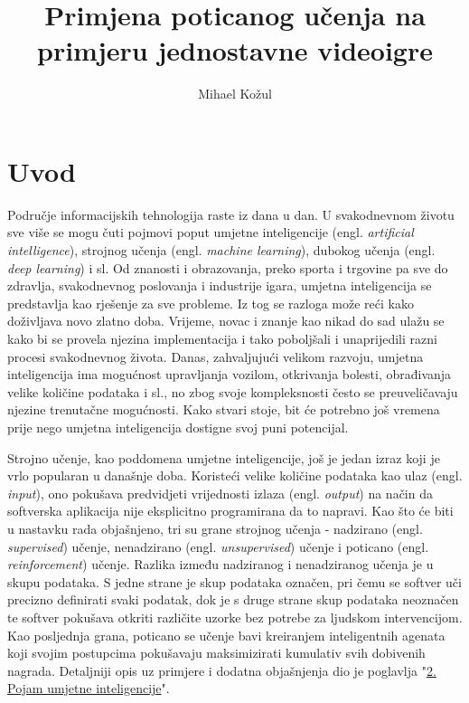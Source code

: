\documentclass[]{foi} %
\title{Primjena poticanog učenja na primjeru jednostavne videoigre}
\author{Mihael Kožul} %
\begin{document}
\maketitle

\tableofcontents

\makeatletter {} \makeatother
\pagestyle{plain}

\chapter{Uvod}
Područje informacijskih tehnologija raste iz dana u dan. U svakodnevnom životu sve više se mogu čuti pojmovi poput umjetne inteligencije (engl. \textit{artificial intelligence}), strojnog učenja (engl. \textit{machine learning}), dubokog učenja (engl. \textit{deep learning}) i sl. Od znanosti i obrazovanja, preko sporta i  trgovine pa sve do zdravlja, svakodnevnog poslovanja i industrije igara, umjetna inteligencija se predstavlja kao rješenje za sve probleme. Iz tog se razloga može reći kako doživljava novo zlatno doba. Vrijeme, novac i znanje kao nikad do sad ulažu se kako bi se provela njezina implementacija i tako poboljšali i unaprijedili razni procesi svakodnevnog života. Danas, zahvaljujući velikom razvoju, umjetna inteligencija ima mogućnost upravljanja vozilom, otkrivanja bolesti, obrađivanja velike količine podataka i sl., no zbog svoje kompleksnosti često se preuveličavaju njezine trenutačne mogućnosti. Kako stvari stoje, bit će potrebno još vremena prije nego umjetna inteligencija dostigne svoj puni potencijal.

Strojno učenje, kao poddomena umjetne inteligencije, još je jedan izraz koji je vrlo popularan u današnje doba. Koristeći velike količine podataka kao ulaz (engl. \textit{input}), ono pokušava predvidjeti vrijednosti izlaza (engl. \textit{output}) na način da softverska aplikacija nije eksplicitno programirana da to napravi. Kao što će biti u nastavku rada objašnjeno, tri su grane strojnog učenja - nadzirano (engl. \textit{supervised}) učenje, nenadzirano (engl. \textit{unsupervised}) učenje i poticano (engl. \textit{reinforcement}) učenje. Razlika između nadziranog i nenadziranog učenja je u skupu podataka. S jedne strane je skup podataka označen, pri čemu se softver uči precizno definirati svaki podatak, dok je s druge strane skup podataka neoznačen te softver pokušava otkriti različite uzorke bez potrebe za ljudskom intervencijom. Kao posljednja grana, poticano se učenje bavi kreiranjem inteligentnih agenata koji svojim postupcima pokušavaju maksimizirati kumulativ svih dobivenih nagrada. Detaljniji opis uz primjere i dodatna objašnjenja dio je poglavlja "\hyperref[cha:2.poglavlje]{2. Pojam umjetne inteligencije}".
\end{document}
